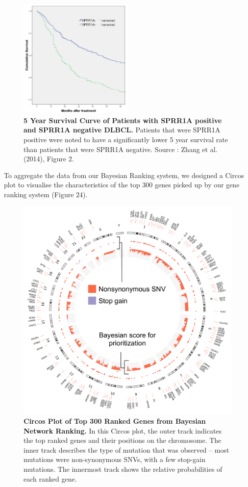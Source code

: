 \documentclass{article}
\begin{document}
\begin{figure}[H]
\centering
\includegraphics[width=0.5\textwidth]{sprr1adataset.jpg}
\caption{ \textbf{5 Year Survival Curve of Patients with SPRR1A positive and SPRR1A negative DLBCL.} Patients that were SPRR1A positive were noted to have a significantly lower 5 year survival rate than patients that were SPRR1A negative. Source : Zhang et al. (2014), Figure 2.}
\end{figure}


To aggregate the data from our Bayesian Ranking system, we designed a Circos plot to visualise the characteristics of the top 300 genes picked up by our gene ranking system (Figure 24).

\begin{figure}[H]
\includegraphics[width=\textwidth]{circosplot.pdf}
\caption{\textbf{Circos Plot of Top 300 Ranked Genes from Bayesian Network Ranking.} In this Circos plot, the outer track indicates the top ranked genes and their positions on the chromosome. The inner track describes the type of mutation that was observed -- most mutations were non-synonymous SNVs, with a few stop-gain mutations. The innermost track shows the relative probabilities of each ranked gene.}
\centering
\end{figure}
\end{document}
